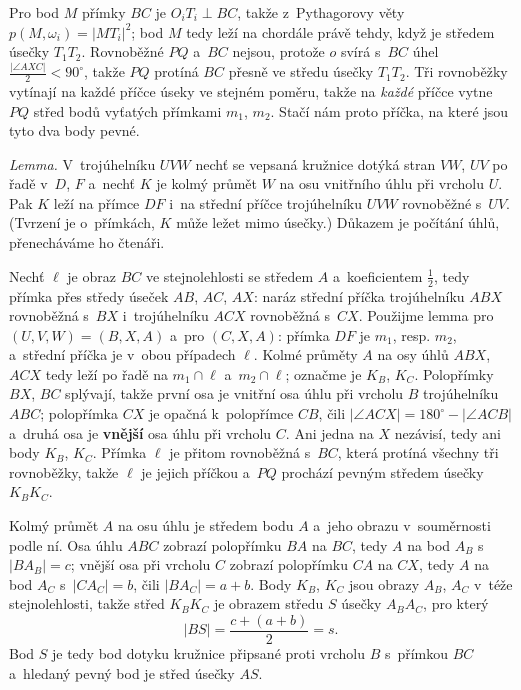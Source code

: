 {    Pro bod $M$ přímky $BC$ je $O_iT_i \perp BC$, takže z~Pythagorovy věty $p(M,\omega_i) = |MT_i|^2$; bod $M$ tedy leží na chordále právě tehdy, když je středem úsečky $T_1T_2$. Rovnoběžné $PQ$ a~$BC$ nejsou, protože $o$ svírá s~$BC$ úhel $\frac{|\angle AXC|}{2} < 90^\circ$, takže $PQ$ protíná $BC$ přesně ve středu úsečky $T_1T_2$. Tři rovnoběžky vytínají na každé příčce úseky ve stejném poměru, takže na \textit{každé} příčce vytne $PQ$ střed bodů vyťatých přímkami $m_1$, $m_2$. Stačí nám proto příčka, na které jsou tyto dva body pevné.

    \textit{Lemma.} V~trojúhelníku $UVW$ nechť se vepsaná kružnice dotýká stran $VW$, $UV$ po řadě v~$D$, $F$ a~nechť $K$ je kolmý průmět $W$ na osu vnitřního úhlu při vrcholu $U$. Pak $K$ leží na přímce $DF$ i~na střední příčce trojúhelníku $UVW$ rovnoběžné s~$UV$. (Tvrzení je o~přímkách, $K$ může ležet mimo úsečky.) Důkazem je počítání úhlů, přenecháváme ho čtenáři.

    Nechť $\ell$ je obraz $BC$ ve stejnolehlosti se středem $A$ a~koeficientem $\frac12$, tedy přímka přes středy úseček $AB$, $AC$, $AX$: naráz střední příčka trojúhelníku $ABX$ rovnoběžná s~$BX$ i~trojúhelníku $ACX$ rovnoběžná s~$CX$. Použijme lemma pro $(U,V,W) = (B,X,A)$ a~pro $(C,X,A)$: přímka $DF$ je $m_1$, resp. $m_2$, a~střední příčka je v~obou případech $\ell$. Kolmé průměty $A$ na osy úhlů $ABX$, $ACX$ tedy leží po řadě na $m_1 \cap \ell$ a~$m_2 \cap \ell$; označme je $K_B$, $K_C$. Polopřímky $BX$, $BC$ splývají, takže první osa je vnitřní osa úhlu při vrcholu $B$ trojúhelníku $ABC$; polopřímka $CX$ je opačná k~polopřímce $CB$, čili $|\angle ACX| = 180^\circ - |\angle ACB|$ a~druhá osa je \textbf{vnější} osa úhlu při vrcholu $C$. Ani jedna na $X$ nezávisí, tedy ani body $K_B$, $K_C$. Přímka $\ell$ je přitom rovnoběžná s~$BC$, která protíná všechny tři rovnoběžky, takže $\ell$ je jejich příčkou a~$PQ$ prochází pevným středem úsečky $K_BK_C$.

    Kolmý průmět $A$ na osu úhlu je středem bodu $A$ a~jeho obrazu v~souměrnosti podle ní. Osa úhlu $ABC$ zobrazí polopřímku $BA$ na $BC$, tedy $A$ na bod $A_B$ s~$|BA_B| = c$; vnější osa při vrcholu $C$ zobrazí polopřímku $CA$ na $CX$, tedy $A$ na bod $A_C$ s~$|CA_C| = b$, čili $|BA_C| = a+b$. Body $K_B$, $K_C$ jsou obrazy $A_B$, $A_C$ v~téže stejnolehlosti, takže střed $K_BK_C$ je obrazem středu $S$ úsečky $A_BA_C$, pro který
    $$
    |BS| = \frac{c + (a+b)}{2} = s.
    $$
    Bod $S$ je tedy bod dotyku kružnice připsané proti vrcholu $B$ s~přímkou $BC$ a~hledaný pevný bod je střed úsečky $AS$.
}

\DisplayHints

\DisplayProblemSolutions

\bye
